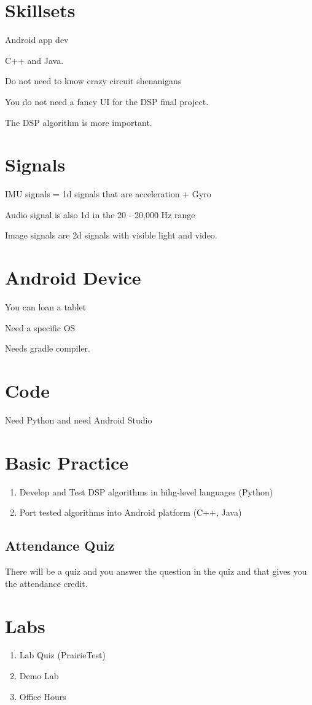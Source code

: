 \documentclass[fleqn]{report}
\begin{document}
\section{Skillsets}
Android app dev 

C++ and Java. 

Do not need to know crazy circuit shenanigans

You do not need a fancy UI for the DSP final project. 

The DSP algorithm is more important.

\section{Signals}
IMU signals = 1d signals that are acceleration + Gyro

Audio signal is also 1d in the 20 - 20,000 Hz range 

Image signals are 2d signals with visible light and video.

\section{Android Device}
You can loan a tablet 

Need a specific OS

Needs gradle compiler.

\section{Code}
Need Python and need Android Studio

\section{Basic Practice}
\begin{enumerate}
    \item
Develop and Test DSP algorithms in hihg-level languages (Python)
    \item
Port tested algorithms into Android platform (C++, Java)
\end{enumerate}

\subsection{Attendance Quiz}
There will be a quiz and you answer the question in the quiz and that gives you 
the attendance credit.

\section{Labs}
\begin{enumerate}
    \item 
    Lab Quiz (PrairieTest)
    \item 
    Demo Lab
    \item 
    Office Hours
\end{enumerate}
\end{document}
